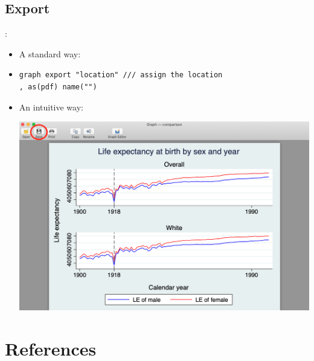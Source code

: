 \subsection{Export}
\begin{frame}[fragile]{\secname: \subsecname}
\begin{itemize}
	\item A standard way: 
	\item[] \begin{verbatim}
graph export "location" /// assign the location
, as(pdf) name("")	
 \end{verbatim}
	\item An intuitive way: \\
	\begin{center}
	\includegraphics[scale=0.2]{images/export}
\end{center}

\end{itemize}

\end{frame}

\section{References}
\begin{frame}{\secname}
    \begin{scriptsize}
	
	
    \end{scriptsize}
\end{frame}

